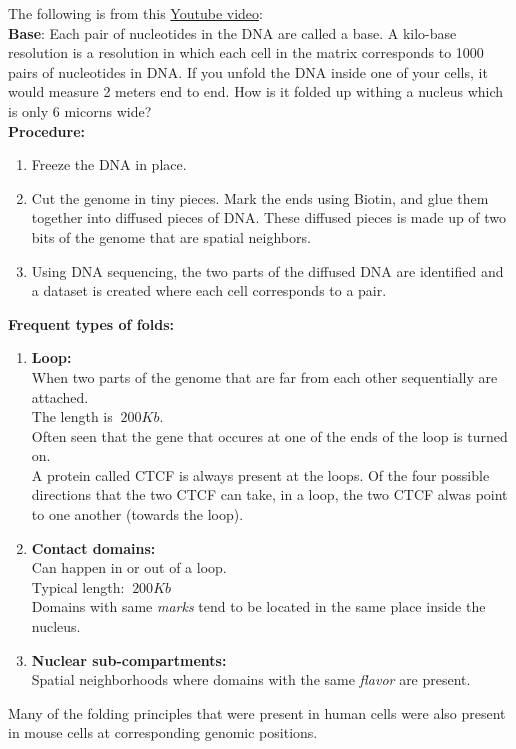 \documentclass{article}
\begin{document}
The following is from this 
\href{https://www.youtube.com/watch?v=dES-ozV65u4}{Youtube video}:
\\\textbf{Base}: Each pair of nucleotides in the DNA are called
a base.
A kilo-base resolution is a resolution in which each cell in
the matrix corresponds to 1000 pairs of nucleotides in DNA.
If you unfold the DNA inside one of your cells, it would measure
2 meters end to end. How is it folded up withing a nucleus which
is only 6 micorns wide?
\\[.1in]\textbf{Procedure:}
\begin{enumerate}
    \item Freeze the DNA in place.
    \item Cut the genome in tiny pieces.
        Mark the ends using Biotin, and glue them together into
        diffused pieces of DNA. These diffused pieces is made
        up of two bits of the genome that are spatial neighbors.
    \item Using DNA sequencing, the two parts of the 
        diffused DNA are identified and a dataset is created
        where each cell corresponds to a pair.
\end{enumerate}
\textbf{Frequent types of folds:}
\begin{enumerate}
    \item \textbf{ Loop:}
        \\When two parts of the genome that 
        are far from each other sequentially are
        attached.
        \\The length is $~200Kb$.
        \\Often seen that the gene that occures at
        one of the ends of the loop is turned on.
        \\A protein called CTCF is always present
        at the loops. Of the four possible directions
        that the two CTCF can take, in a loop, the
        two CTCF alwas point to one another (towards
        the loop).
    \item \textbf{ Contact domains:}
        \\Can happen in or out of a loop.
        \\Typical length: $~200Kb$
        \\Domains with same \textit{marks}
        tend to be located in the same place 
        inside the nucleus.
    \item \textbf{ Nuclear sub-compartments:}
        \\Spatial neighborhoods where domains
        with the same \textit{flavor} are
        present.
\end{enumerate}
Many of the folding principles that were present in 
human cells were also present in mouse cells at 
corresponding genomic positions.
\end{document}
